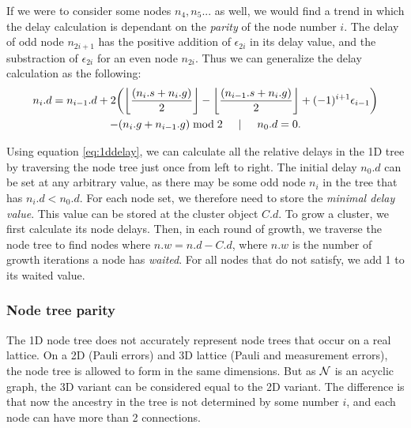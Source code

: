 If we were to consider some nodes $n_4, n_5...$ as well, we would find a trend in which the delay calculation is dependant on the \emph{parity} of the node number $i$. The delay of odd node $n_{2i+1}$ has the positive addition of $\epsilon_{2i}$ in its delay value, and the substraction of $\epsilon_{2i}$ for an even node $n_{2i}$. Thus we can generalize the delay calculation as the following:
\begin{multline}\label{eq:1ddelay}
n_i.d = n_{i-1}.d + 2\bigg({\left \lfloor \frac{(n_i.s+n_i.g)}{2} \right \rfloor } - {\left \lfloor \frac{(n_{i-1}.s+n_i.g)}{2} \right \rfloor } + (-1)^{i+1}\epsilon_{i-1}\bigg) \\
         - (n_{i}.g + n_{i-1}.g)\bmod 2 \hspace{.5cm} | \hspace{.5cm} n_0.d = 0.
\end{multline}

Using equation \ref{eq:1ddelay}, we can calculate all the relative delays in the 1D tree by traversing the node tree just once from left to right. The initial delay $n_0.d$ can be set at any arbitrary value, as there may be some odd node $n_i$ in the tree that has $n_i.d < n_0.d$. For each node set, we therefore need to store the \emph{minimal delay value}. This value can be stored at the cluster object $C.d$. To grow a cluster, we first calculate its node delays. Then, in each round of growth, we traverse the node tree to find nodes where $n.w = n.d - C.d$, where $n.w$ is the number of growth iterations a node has \emph{waited}. For all nodes that do not satisfy, we add 1 to its waited value.

\subsubsection{Node tree parity}

The 1D node tree does not accurately represent node trees that occur on a real lattice. On a 2D (Pauli errors) and 3D lattice (Pauli and measurement errors), the node tree is allowed to form in the same dimensions. But as $\mathcal{N}$ is an acyclic graph, the 3D variant can be considered equal to the 2D variant. The difference is that now the ancestry in the tree is not determined by some number $i$, and each node can have more than 2 connections. 

